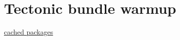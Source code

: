 \documentclass{article}
\begin{document}
\section{Tectonic bundle warmup}
\href{https://example.invalid}{cached packages}
\end{document}
